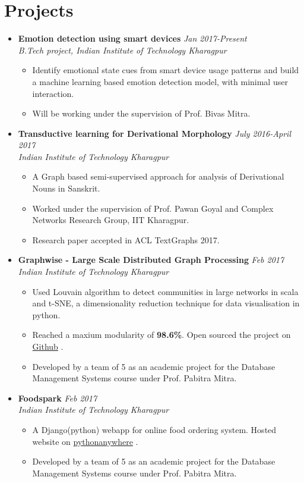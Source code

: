 \documentclass[10pt,a4paper]{moderncv}
\newcommand{\experience}[4]{
  \vspace{0.1cm}
  \item \textbf{\large{#1}} \hfill\textit{#3}\\\textit{#2}
  \begin{itemize}[leftmargin=*]
    \setlength\itemsep{0em} #4
  \end{itemize}
}
\newcommand{\newlink}[2]{
  \href{#1}{\color{blue}#2}
}
\begin{document}
\vspace{-0.1cm}
\section*{Projects}
\begin{itemize}
  \setlength\itemsep{0.5em}

  \experience{Emotion detection using smart devices}{B.Tech project, Indian Institute of Technology Kharagpur}{Jan 2017-Present}{
  	\item Identify emotional state cues from smart device usage patterns and build a machine learning based emotion detection model, with minimal user interaction.
  	\item Will be working under the supervision of Prof. Bivas Mitra.
  }

  \experience{Transductive learning for Derivational Morphology}{Indian Institute of Technology Kharagpur}{July 2016-April 2017}{
    \item A Graph based semi-supervised approach for analysis of Derivational Nouns in Sanskrit.
    \item	Worked under the supervision of Prof. Pawan Goyal and Complex Networks Research Group, IIT Kharagpur.
    \item Research paper accepted in ACL TextGraphs 2017.
  }

  \experience{Graphwise - Large Scale Distributed Graph Processing}{Indian Institute of Technology Kharagpur}{Feb 2017}{
  	\item Used Louvain algorithm to detect communities in large networks in scala and t-SNE, a dimensionality reduction technique for data visualisation in python.
  	\item Reached a maxium modularity of \textbf{98.6\%}. Open sourced the project on \newlink{https://github.com/kaustubhhiware/Graphwise}{Github}.
  	\item Developed by a team of 5 as an academic project for the Database Management Systems course under Prof. Pabitra Mitra.
  }

  \experience{Foodspark}{Indian Institute of Technology Kharagpur}{Feb 2017}{
  	\item A Django(python) webapp for online food ordering system. Hosted website on \newlink{http://foodkgp.pythonanywhere.com/}{pythonanywhere}.
  	\item Developed by a team of 5 as an academic project for the Database Management Systems course under Prof. Pabitra Mitra.
  }
 

\end{itemize}
\end{document}
